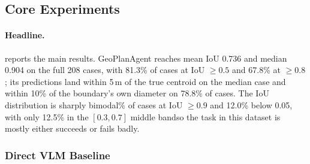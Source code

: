 \documentclass[11pt]{article}
\begin{document}
\begin{table}[t]
\caption{Main results on Plan2Map. Bold = best in each column. \emph{Valid}: fraction of cases producing a polygon that overlaps ground truth at all (IoU\,$>$\,0). \emph{Mean IoU}, \emph{Med IoU}, \emph{IoU\,$\geq$\,0.8} are case-level statistics over per-case IoU. \emph{F1} is the polygon overlap F1 ($2\cdot|G\cap P| / (|G|+|P|)$) where $G$ is the ground-truth polygon and $P$ our prediction. \emph{Err}: median centroid distance between predicted and ground-truth boundaries in metres. We use median because the distribution is strongly right-skewed by a small tail of severe failures (GeoPlanAgent mean $=1182$\,m, median $=5$\,m, max $=190$\,km; 7.7\% of cases off by more than 1\,km). \emph{Tight}: fraction of cases whose centroid distance is at most 10\% of the ground-truth Feret diameter (the longest pairwise distance between convex-hull vertices, in metres). \emph{\$/doc} is mean USD per document computed as $(\text{mean input tokens}) \cdot p_{\text{in}} + (\text{mean output tokens}) \cdot p_{\text{out}}$ using OpenRouter prices as of 2026-05-24 (the per-million-token rate for the model that produced the row); it is an upper bound, as OpenRouter's automatic prompt caching is not deducted. \emph{Time} is mean wall-clock per case. The Gemini-3.1-Pro row is the strongest of four direct-VLM models we evaluated on a 40-case stratified subset (per-model results in Table~\ref{tab:vlm-models}).}
\label{tab:main-result}
\end{table}

\subsection{Core Experiments}
\paragraph{Headline.}
 reports the main results. GeoPlanAgent reaches mean IoU 0.736 and median 0.904 on the full 208 cases, with 81.3\% of cases at IoU $\geq 0.5$ and 67.8\% at $\geq 0.8$; its predictions land within 5\,m of the true centroid on the median case and within 10\% of the boundary's own diameter on 78.8\% of cases. The IoU distribution is sharply bimodal\% of cases at IoU $\geq 0.9$ and 12.0\% below 0.05, with only 12.5\% in the $[0.3, 0.7]$ middle band\textemdash so the task in this dataset is mostly either succeeds or fails badly.

\subsubsection{Direct VLM Baseline}
\label{subsection:abl-vlm-direct}
\end{document}
